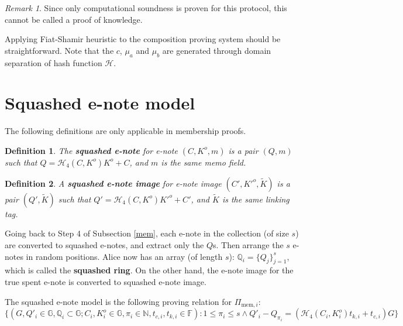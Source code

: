 \documentclass{article}
\theoremstyle{plain}
\newtheorem{definition}{Definition}[section]
\theoremstyle{remark}
\newtheorem*{remark}{Remark}
\begin{document}
\begin{remark}
Since only computational soundness is proven for this protocol, this cannot be called a proof of knowledge.
\end{remark}

Applying Fiat-Shamir heuristic to the composition proving system should be straightforward. Note that the $c$, $\mu_a$ and $\mu_b$ are generated through domain separation of hash function $\mathcal{H}$.

\section{Squashed e-note model}\label{squashed}
The following definitions are only applicable in membership proofs.
\begin{definition}\label{sq-e-note}
The \textbf{\em squashed e-note} for e-note $(C, K^o, m)$ is a pair $(Q, m)$ such that $Q = \mathcal{H}_4(C, K^o) K^o + C$, and $m$ is the same memo field.
\end{definition}
\begin{definition}\label{sq-e-note-img}
A \textbf{\em squashed e-note image} for e-note image $(C', K'^o, \tilde{K})$ is a pair $(Q', \tilde{K})$ such that $Q' = \mathcal{H}_4(C, K^o) K'^o + C'$, and $\tilde{K}$ is the same linking tag.
\end{definition}

Going back to Step 4 of Subsection \ref{mem}, each e-note in the collection (of size $s$) are converted to squashed e-notes, and extract only the $Q$s. Then arrange the $s$ e-notes in random positions. Alice now has an array (of length $s$): $\mathbb{Q}_i = \{Q_j\}_{j=1}^s$, which is called the \textbf{squashed ring}. On the other hand, the e-note image for the true spent e-note is converted to squashed e-note image.

The squashed e-note model is the following proving relation for $\Pi_{\text{mem}, i}$:
$$\{(G, Q'_i \in\mathbb{G}, \mathbb{Q}_i\subset\mathbb{G}; C_i, K_i^o \in \mathbb{G}, \pi_i\in\mathbb{N}, t_{c,i}, t_{k,i}\in\mathbb{F}): 1\le\pi_i\le s \wedge Q'_i - Q_{\pi_i} = ( \mathcal{H}_4(C_i, K_i^o) t_{k,i} + t_{c,i}) G \}$$
\end{document}
